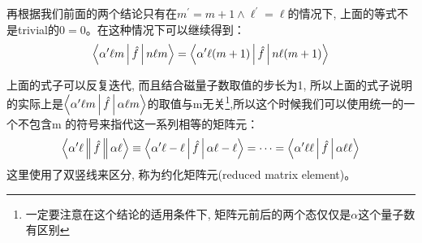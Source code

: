 再根据我们前面的两个结论只有在$m^\prime=m+1 \wedge \ell^\prime=\ell$的情况下, 上面的等式不是trivial的$0=0$。在这种情况下可以继续得到：
\begin{equation}
    \Braket{\alpha^\prime\ell m|\hat{f}|n\ell m}=\Braket{\alpha^\prime\ell (m+1)|\hat{f}|n\ell (m+1)}
\end{equation}

上面的式子可以反复迭代, 而且结合磁量子数取值的步长为1, 所以上面的式子说明的实际上是$\Braket{\alpha^\prime \ell m|\hat{f}|\alpha\ell m}$的取值与m无关\footnote{一定要注意在这个结论的适用条件下, 矩阵元前后的两个态仅仅是$\alpha$这个量子数有区别},所以这个时候我们可以使用统一的一个不包含m 的符号来指代这一系列相等的矩阵元：
\begin{equation}
    \label{eq:6.53}
    \Braket{\alpha^\prime \ell \|\hat{f}\|\alpha\ell }\equiv\Braket{\alpha^\prime \ell -\ell|\hat{f}|\alpha\ell -\ell}=\cdots=\Braket{\alpha^\prime \ell \ell|\hat{f}|\alpha\ell \ell}
\end{equation}
这里使用了双竖线来区分, 称为约化矩阵元(reduced matrix element)。

